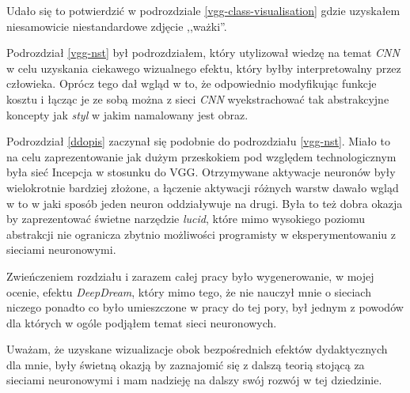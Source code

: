 Udało się to potwierdzić w podrozdziale \ref{vgg-class-visualisation} gdzie uzyskałem niesamowicie niestandardowe zdjęcie ,,ważki''. 

Podrozdział \ref{vgg-nst} był podrozdziałem, który utylizował wiedzę na temat \textit{CNN} w celu uzyskania ciekawego wizualnego efektu, który byłby interpretowalny przez człowieka. Oprócz tego dał wgląd w to, że odpowiednio modyfikując funkcje kosztu i łącząc je ze sobą można z sieci \textit{CNN} wyekstrachować tak abstrakcyjne koncepty jak \textit{styl} w jakim namalowany jest obraz.

Podrozdział \ref{ddopis} zaczynał się podobnie do podrozdziału \ref{vgg-nst}. Miało to na celu zaprezentowanie jak dużym przeskokiem pod względem technologicznym była sieć Incepcja w stosunku do VGG. Otrzymywane aktywacje neuronów były wielokrotnie bardziej złożone, a łączenie aktywacji różnych warstw dawało wgląd w to w jaki sposób jeden neuron oddziaływuje na drugi. Była to też dobra okazja by zaprezentować świetne narzędzie \textit{lucid}, które mimo wysokiego poziomu abstrakcji nie
ogranicza zbytnio możliwości programisty w eksperymentowaniu z sieciami neuronowymi.

Zwieńczeniem rozdziału i zarazem całej pracy było wygenerowanie, w mojej ocenie, efektu \textit{DeepDream}, który mimo tego, że nie nauczył mnie o sieciach niczego ponadto co było umieszczone w pracy do tej pory, był jednym z powodów dla których w ogóle podjąłem temat sieci neuronowych.

Uważam, że uzyskane wizualizacje obok bezpośrednich efektów dydaktycznych dla mnie, były świetną okazją by zaznajomić się z dalszą teorią stojącą za sieciami neuronowymi i mam nadzieję na dalszy swój rozwój w tej dziedzinie.
